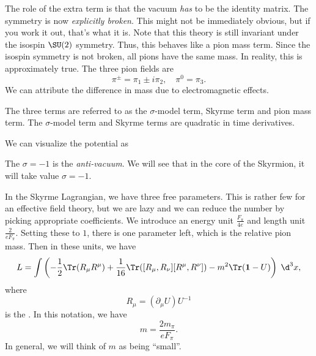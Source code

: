 \documentclass[a4paper]{article}
\begin{document}
The role of the extra term is that the vacuum \emph{has} to be the identity matrix. The symmetry is now \emph{explicitly broken}. This might not be immediately obvious, but if you work it out, that's what it is. Note that this theory is still invariant under the isospin $\SU(2)$ symmetry. Thus, this behaves like a pion mass term. Since the isospin symmetry is not broken, all pions have the same mass. In reality, this is approximately true. The three pion fields are
\[
  \pi^{\pm} = \pi_1 \pm i \pi_2,\quad \pi^0 = \pi_3.
\]
We can attribute the difference in mass due to electromagnetic effects.

The three terms are referred to as the $\sigma$-model term, Skyrme term and pion mass term. The $\sigma$-model term and Skyrme terms are quadratic in time derivatives.

We can visualize the potential as
\begin{center}
\end{center}
The $\sigma = -1$ is the \emph{anti-vacuum}. We will see that in the core of the Skyrmion, it will take value $\sigma = -1$.

In the Skyrme Lagrangian, we have three free parameters. This is rather few for an effective field theory, but we are lazy and we can reduce the number by picking appropriate coefficients. We introduce an energy unit $\frac{F_\pi}{4e}$ and length unit $\frac{2}{eF_\pi}$. Setting these to $1$, there is one parameter left, which is the relative pion mass. Then in these units, we have
\[
  L = \int \left(-\frac{1}{2}\Tr(R_\mu R^\mu) + \frac{1}{16} \Tr([R_\mu, R_\nu][R^\mu, R^\nu]) - m^2 \Tr(\mathbf{1} - U)\right)\;\d^3 x,
\]
where
\[
  R_\mu = (\partial_\mu U)U^{-1}
\]
is the . In this notation, we have
\[
  m = \frac{2m_\pi}{e F_\pi}.
\]
In general, we will think of $m$ as being ``small''.
\end{document}

